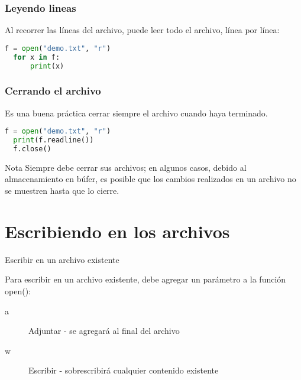 \begin{frame}[fragile]
  \frametitle{Leyendo lineas}

  Al recorrer las líneas del archivo, puede leer todo el
  archivo, línea por línea:

  \vspace{\baselineskip}
  \begin{lstlisting}[language=Python]
  f = open("demo.txt", "r")
  for x in f:
      print(x)
  \end{lstlisting}
\end{frame}

\begin{frame}[fragile]
  \frametitle{Cerrando el archivo}

  Es una buena práctica cerrar siempre el archivo
  cuando haya terminado.

  \vspace{\baselineskip}
  \begin{lstlisting}[language=Python]
  f = open("demo.txt", "r")
  print(f.readline())
  f.close()
  \end{lstlisting}

  \pausa
  \begin{exampleblock}{Nota}
    Siempre debe cerrar sus archivos; en algunos casos,
    debido al almacenamiento en búfer, es posible que los
    cambios realizados en un archivo no se muestren hasta
    que lo cierre. 
  \end{exampleblock}
\end{frame}

\section{Escribiendo en los archivos}

\begin{frame}[c]{Escribir en un archivo existente}

  Para escribir en un archivo existente, debe agregar un
  parámetro a la función \textcolor{codeKeyword}{open}():

  \vspace{\baselineskip}
  \begin{description}
    \item[a] Adjuntar - se agregará al final del archivo
    \item[w] Escribir - sobrescribirá cualquier contenido existente 
  \end{description}
\end{frame}

